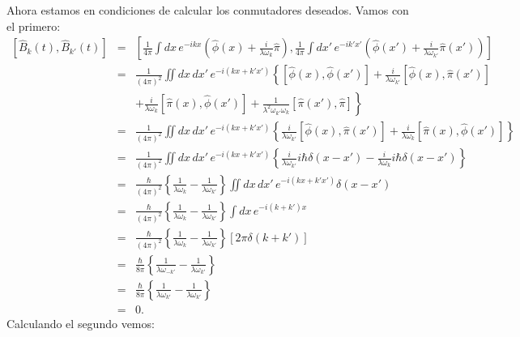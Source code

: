Ahora estamos en condiciones de calcular los conmutadores deseados. Vamos con el
primero:
\begin{eqnarray}
\left[ \hat{B}_k(t) ,\hat{B}_{k'}(t) \right] & = &\left[ \frac{1}{4\pi}\int
dx\,e^{-ikx}\left(\hat{\phi}(x)
+\frac{i}{\lambda\omega_k}\hat{\pi}\right) ,
\frac{1}{4\pi}\int dx'\, e^{-ik'x'}\left( \hat{\phi}(x')
+\frac{i}{\lambda\omega_{k'}}\hat{\pi}(x') \right) \right]\\
& = &\frac{1}{\left( 4\pi\right) ^{2}}\iint dx\,dx'\,e^{-i(kx+k'x')}\left\{
\left[\hat{\phi}(x) ,\hat{\phi}(x') \right]
+\frac{i}{\lambda\omega_{k'}}\left[\hat{\phi}(x) ,\hat{\pi}(x') \right]
\right.\nonumber\\
&&\left.+\frac{i}{\lambda\omega_k}\left[ \hat{\pi}(x),\hat{\phi}(x') \right]
+\frac{1}{\lambda^{2}\omega_{k'}\omega_k}\left[ \hat{\pi}(x')
,\hat{\pi}\right] \right\} \\
& = &\frac{1}{\left( 4\pi\right) ^{2}}\iint dx\, dx'\,e^{-i(kx+k'x')}\left\{
\frac{i}{\lambda\omega_{k'}}\left[\hat{\phi}(x) ,\hat{\pi}(x') \right]
+\frac{i}{\lambda\omega_k}\left[ \hat{\pi}(x),\hat{\phi}(x') \right] \right\}
\\
& = &\frac{1}{\left( 4\pi\right)^{2}}\iint dx\,dx'\,e^{-i(kx+k'x')}\left\{
\frac{i}{\lambda\omega_{k'}}i\hbar\delta(x-x')
-\frac{i}{\lambda\omega_k}i\hbar\delta(x-x') \right\} \\
& = &\frac{\hbar}{\left( 4\pi\right) ^{2}}\left\{
\frac{1}{\lambda\omega_k}-\frac{1}{\lambda\omega_{k'}}\right\}\iint
dx\,dx'\,e^{-i(kx+k'x')}\delta(x-x') \\
& = &\frac{\hbar}{\left( 4\pi\right) ^{2}}\left\{
\frac{1}{\lambda\omega_k}-\frac{1}{\lambda\omega_{k'}}\right\} \int
dx\,e^{-i(k+k')x}\\
& = &\frac{\hbar}{\left( 4\pi\right)^{2}}\left\{
\frac{1}{\lambda\omega_k}-\frac{1}{\lambda\omega_{k'}}\right\} \left[
2\pi\delta (k+k') \right] \\
& = &\frac{\hbar}{8\pi}\left\{
\frac{1}{\lambda\omega_{-k'}}-\frac{1}{\lambda\omega_{k'}}\right\}\\
& = &\frac{\hbar}{8\pi}\left\{
\frac{1}{\lambda\omega_{k'}}-\frac{1}{\lambda\omega_{k'}}\right\} \\
& = &0 .
\end{eqnarray}
Calculando el segundo vemos:
